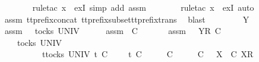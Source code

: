 \ \ \ \ \ \ \isamarkupfalse%
\ {\isacharparenleft}rule{\isacharunderscore}tac\ x{\isacharequal}{\isachardoublequoteopen}{\isasymrho}{\isacharprime}{\isachardoublequoteclose}\ \ exI{\isacharcomma}\ simp\ add{\isacharcolon}\ assm{}{\isacharparenright}\isanewline
\ \ \ \ \ \ \isamarkupfalse%
\ {\isacharparenleft}rule{\isacharunderscore}tac\ x{\isacharequal}{\isachardoublequoteopen}{\isacharbrackleft}{\isacharbrackright}{\isachardoublequoteclose}\ \ exI{\isacharcomma}\ auto{\isacharparenright}\isanewline
\ \ \ \ \ \ \isamarkupfalse%
\ assm{}\ tt{\isacharunderscore}prefix{\isacharunderscore}concat\ tt{\isacharunderscore}prefix{\isacharunderscore}subset{\isacharunderscore}tt{\isacharunderscore}prefix{\isacharunderscore}trans\ \isamarkupfalse%
\ blast\isanewline
\ \ \isamarkupfalse%
\isanewline
\ \ \ \ \isamarkupfalse%
\ Y\isanewline
\ \ \ \ \isamarkupfalse%
\ assm{}{\isacharcolon}\ {\isachardoublequoteopen}{\isasymrho}{\isacharprime}\ {\isasymin}\ tocks\ UNIV{\isachardoublequoteclose}\isanewline
\ \ \ \ \isamarkupfalse%
\ assm{}{\isacharcolon}\ {\isachardoublequoteopen}{\isasymsigma}{\isacharprime}\ {\isasymlesssim}\isactrlsub C\ {\isasymsigma}{\isachardoublequoteclose}\isanewline
\ \ \ \ \isamarkupfalse%
\ assm{}{\isacharcolon}\ {\isachardoublequoteopen}{\isasymrho}{\isacharprime}\ {\isacharat}\ {\isacharbrackleft}{\isacharbrackleft}Y{\isacharbrackright}\isactrlsub R{\isacharbrackright}\ {\isasymlesssim}\isactrlsub C\ {\isasymrho}{\isachardoublequoteclose}\isanewline
\ \ \ \ \isamarkupfalse%
\ {\isachardoublequoteopen}{\isasymexists}{\isasymrho}{\isacharprime}{\isachardot}\ {\isasymrho}{\isacharprime}\ {\isasymin}\ tocks\ UNIV\ {\isasymand}\isanewline
\ \ \ \ \ \ \ \ \ {\isacharparenleft}{\isasymexists}{\isasymsigma}{\isacharprime}{\isachardot}\ {\isacharparenleft}{\isasymforall}t{\isasymin}tocks\ UNIV{\isachardot}\ t\ {\isasymle}\isactrlsub C\ {\isasymrho}{\isacharprime}\ {\isacharat}\ {\isasymsigma}{\isacharprime}\ {\isasymlongrightarrow}\ t\ {\isasymle}\isactrlsub C\ {\isasymrho}{\isacharprime}{\isacharparenright}\ {\isasymand}\ {\isasymrho}{\isacharprime}\ {\isacharat}\ {\isasymsigma}{\isacharprime}\ {\isasymlesssim}\isactrlsub C\ {\isasymrho}\ {\isacharat}\ {\isasymsigma}\ {\isasymand}\ {\isacharparenleft}{\isasymsigma}{\isacharprime}\ {\isasymlesssim}\isactrlsub C\ {\isasymsigma}\ {\isasymor}\ {\isacharparenleft}{\isasymexists}X{\isachardot}\ {\isasymsigma}{\isacharprime}\ {\isasymlesssim}\isactrlsub C\ {\isacharbrackleft}X{\isacharbrackright}\isactrlsub R\ {\isacharhash}\ {\isasymsigma}{\isacharparenright}{\isacharparenright}{\isacharparenright}{\isachardoublequoteclose}\isanewline
